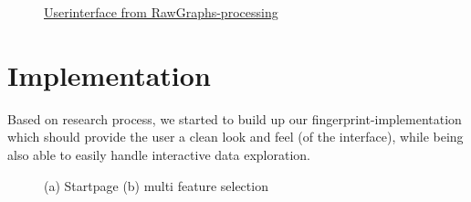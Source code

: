 \documentclass[runningheads]{llncs}
\begin{document}
\begin{figure}
    \centering
    \caption{\href{https://rawgraphs.io}{Userinterface from RawGraphs-processing}}
    \label{fig:website-reference}
\end{figure}


\section{Implementation}
Based on research process, we started to build up our fingerprint-implementation which should provide the user a clean look and feel (of the interface), while being also able to easily handle interactive data exploration.

\begin{figure}
    \centering
    \caption{(a) Startpage (b) multi feature selection}
    \label{fig:gui}
\end{figure}
\end{document}
